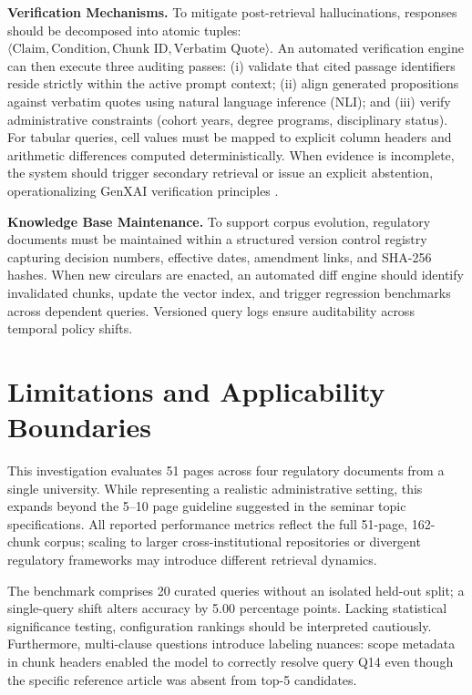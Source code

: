 \documentclass[12pt,a4paper]{article}
\begin{document}
\textbf{Verification Mechanisms.} To mitigate post-retrieval hallucinations, responses should be decomposed into atomic tuples: $\langle\text{Claim}, \text{Condition}, \text{Chunk ID}, \text{Verbatim Quote}\rangle$. An automated verification engine can then execute three auditing passes: (i) validate that cited passage identifiers reside strictly within the active prompt context; (ii) align generated propositions against verbatim quotes using natural language inference (NLI); and (iii) verify administrative constraints (cohort years, degree programs, disciplinary status). For tabular queries, cell values must be mapped to explicit column headers and arithmetic differences computed deterministically. When evidence is incomplete, the system should trigger secondary retrieval or issue an explicit abstention, operationalizing GenXAI verification principles \cite{ref2}.

\textbf{Knowledge Base Maintenance.} To support corpus evolution, regulatory documents must be maintained within a structured version control registry capturing decision numbers, effective dates, amendment links, and SHA-256 hashes. When new circulars are enacted, an automated diff engine should identify invalidated chunks, update the vector index, and trigger regression benchmarks across dependent queries. Versioned query logs ensure auditability across temporal policy shifts.

\section{Limitations and Applicability Boundaries}

This investigation evaluates 51 pages across four regulatory documents from a single university. While representing a realistic administrative setting, this expands beyond the 5--10 page guideline suggested in the seminar topic specifications. All reported performance metrics reflect the full 51-page, 162-chunk corpus; scaling to larger cross-institutional repositories or divergent regulatory frameworks may introduce different retrieval dynamics.

The benchmark comprises 20 curated queries without an isolated held-out split; a single-query shift alters accuracy by 5.00 percentage points. Lacking statistical significance testing, configuration rankings should be interpreted cautiously. Furthermore, multi-clause questions introduce labeling nuances: scope metadata in chunk headers enabled the model to correctly resolve query Q14 even though the specific reference article was absent from top-5 candidates.
\end{document}
